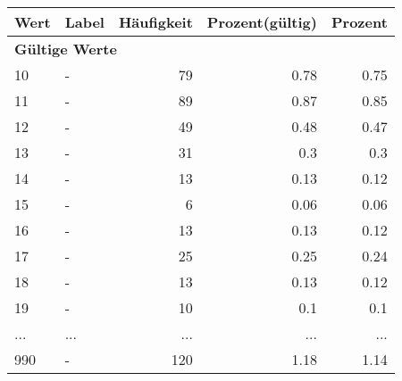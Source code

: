      \begin{longtable}{lXrrr}
     \toprule
     \textbf{Wert} & \textbf{Label} & \textbf{Häufigkeit} & \textbf{Prozent(gültig)} & \textbf{Prozent} \\
     \endhead
     \midrule
     \multicolumn{5}{l}{\textbf{Gültige Werte}}\\
        10 & \multicolumn{1}{X}{-} & %
          \num{79} &
          \num[round-mode=places,round-precision=2]{0,78} &
          \num[round-mode=places,round-precision=2]{0,75} \\
        11 & \multicolumn{1}{X}{-} & %
          \num{89} &
          \num[round-mode=places,round-precision=2]{0,87} &
          \num[round-mode=places,round-precision=2]{0,85} \\
        12 & \multicolumn{1}{X}{-} & %
          \num{49} &
          \num[round-mode=places,round-precision=2]{0,48} &
          \num[round-mode=places,round-precision=2]{0,47} \\
        13 & \multicolumn{1}{X}{-} & %
          \num{31} &
          \num[round-mode=places,round-precision=2]{0,3} &
          \num[round-mode=places,round-precision=2]{0,3} \\
        14 & \multicolumn{1}{X}{-} & %
          \num{13} &
          \num[round-mode=places,round-precision=2]{0,13} &
          \num[round-mode=places,round-precision=2]{0,12} \\
        15 & \multicolumn{1}{X}{-} & %
          \num{6} &
          \num[round-mode=places,round-precision=2]{0,06} &
          \num[round-mode=places,round-precision=2]{0,06} \\
        16 & \multicolumn{1}{X}{-} & %
          \num{13} &
          \num[round-mode=places,round-precision=2]{0,13} &
          \num[round-mode=places,round-precision=2]{0,12} \\
        17 & \multicolumn{1}{X}{-} & %
          \num{25} &
          \num[round-mode=places,round-precision=2]{0,25} &
          \num[round-mode=places,round-precision=2]{0,24} \\
        18 & \multicolumn{1}{X}{-} & %
          \num{13} &
          \num[round-mode=places,round-precision=2]{0,13} &
          \num[round-mode=places,round-precision=2]{0,12} \\
        19 & \multicolumn{1}{X}{-} & %
          \num{10} &
          \num[round-mode=places,round-precision=2]{0,1} &
          \num[round-mode=places,round-precision=2]{0,1} \\
       ... & ... & ... & ... & ... \\
        990 & \multicolumn{1}{X}{-} & %
          \num{120} &
          \num[round-mode=places,round-precision=2]{1,18} &
          \num[round-mode=places,round-precision=2]{1,14} \\


\end{longtable}
